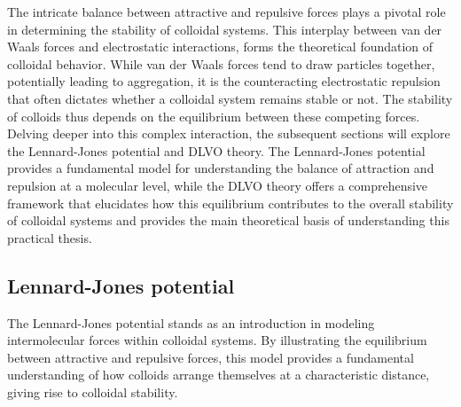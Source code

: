 The intricate balance between attractive and repulsive forces plays a pivotal role in determining the stability of colloidal systems. This interplay between van der Waals forces and electrostatic interactions, forms the theoretical foundation of colloidal behavior. While van der Waals forces tend to draw particles together, potentially leading to aggregation, it is the counteracting electrostatic repulsion that often dictates whether a colloidal system remains stable or not. The stability of colloids thus depends on the equilibrium between these competing forces. Delving deeper into this complex interaction, the subsequent sections will explore the Lennard-Jones potential and DLVO theory. The Lennard-Jones potential provides a fundamental model for understanding the balance of attraction and repulsion at a molecular level, while the DLVO theory offers a comprehensive framework that elucidates how this equilibrium contributes to the overall stability of colloidal systems and provides the main theoretical basis of understanding this practical thesis.

\subsection{Lennard-Jones potential} %

The Lennard-Jones potential stands as an introduction in modeling intermolecular forces within colloidal systems. By illustrating the equilibrium between attractive and repulsive forces, this model provides a fundamental understanding of how colloids arrange themselves at a characteristic distance, giving rise to colloidal stability.

